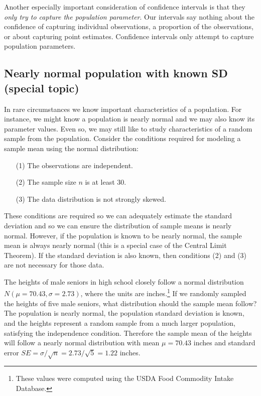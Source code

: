 Another especially important consideration of confidence intervals is that they \emph{only try to capture the population parameter}. Our intervals say nothing about the confidence of capturing individual observations, a proportion of the observations, or about capturing point estimates. Confidence intervals only attempt to capture population parameters.


\subsection[Nearly normal population with known SD (special topic)]{Nearly normal population with known SD (special topic)}
\label{nearlyNormalPopWithKnownSD}


In rare circumstances we know important characteristics of a population. For instance, we might know a population is nearly normal and we may also know its parameter values. Even so, we may still like to study characteristics of a random sample from the population. Consider the conditions required for modeling a sample mean using the normal distribution:
\begin{enumerate}
\setlength{\itemsep}{0mm}
\item[(1)] The observations are independent.
\item[(2)] The sample size $n$ is at least 30.
\item[(3)] The data distribution is not strongly skewed.
\end{enumerate}
These conditions are required so we can adequately estimate the standard deviation and so we can ensure the distribution of sample means is nearly normal. However, if the population is known to be nearly normal, the sample mean is always nearly normal (this is a special case of the Central Limit Theorem). If the standard deviation is also known, then conditions (2) and (3) are not necessary for those data.

\begin{example}{The heights of male seniors in high school closely follow a normal distribution $N(\mu=70.43, \sigma=2.73)$, where the units are inches.\footnote{These values were computed using the USDA Food Commodity Intake Database.} If we randomly sampled the heights of five male seniors, what distribution should the sample mean follow?}\label{simpleSampleOfFiveMaleSeniors}
The population is nearly normal, the population standard deviation is known, and the heights represent a random sample from a much larger population, satisfying the independence condition. Therefore the sample mean of the heights will follow a nearly normal distribution with mean $\mu=70.43$ inches and standard error $SE=\sigma/\sqrt{n} = 2.73/\sqrt{5}=1.22$ inches.
\end{example}

